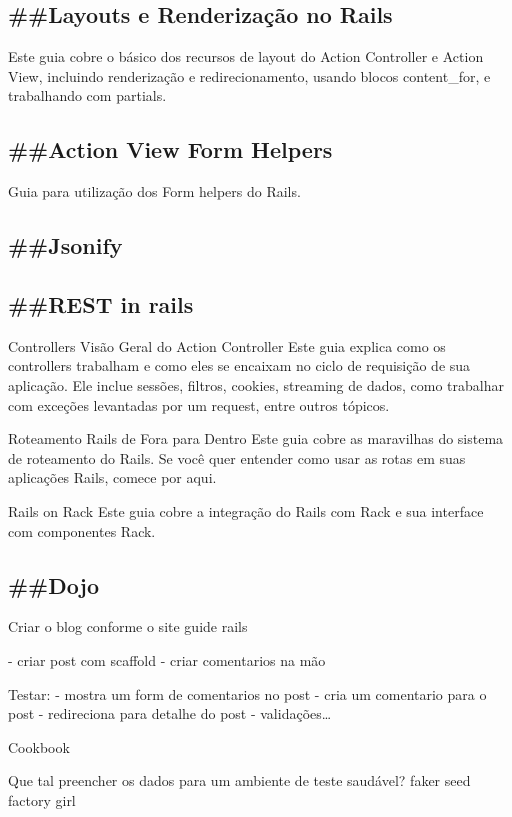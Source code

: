 \documentclass[serif,mathserif]{article}
\begin{document}
\subsection{\#\#Layouts e Renderização no Rails}
  Este guia cobre o básico dos recursos de layout do Action Controller e Action View,
  incluindo renderização e redirecionamento, usando blocos content\_for, e trabalhando com partials.

\subsection{\#\#Action View Form Helpers}
  Guia para utilização dos Form helpers do Rails.

\subsection{\#\#Jsonify}

\subsection{\#\#REST in rails}

Controllers
Visão Geral do Action Controller
Este guia explica como os controllers trabalham e como eles se encaixam no ciclo de requisição de sua aplicação. Ele inclue sessões, filtros, cookies, streaming de dados, como trabalhar com exceções levantadas por um request, entre outros tópicos.

Roteamento Rails de Fora para Dentro
Este guia cobre as maravilhas do sistema de roteamento do Rails. Se você quer entender como usar as rotas em suas aplicações Rails, comece por aqui.

Rails on Rack
Este guia cobre a integração do Rails com Rack e sua interface com componentes Rack.

\subsection{\#\#Dojo}

Criar o blog conforme o site guide rails

- criar post com scaffold
- criar comentarios na mão

Testar:
- mostra  um form de comentarios no post
- cria um comentario para o  post
- redireciona para detalhe do post
- validações\ldots

Cookbook

Que tal preencher os dados para um ambiente de teste saudável?
faker
seed
factory girl
\end{document}
